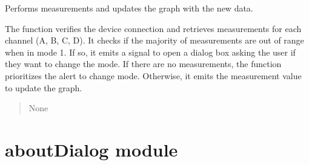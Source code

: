 \documentclass[letterpaper,10pt,english]{sphinxmanual}
\begin{document}
\begin{fulllineitems}

\begin{fulllineitems}
\label{\detokenize{StartStopHist:StartStopHist.WorkerThreadStartStopHistogram.threadCreated}}
\pysigstartsignatures
{}
\pysigstopsignatures
\end{fulllineitems}


\begin{fulllineitems}
\label{\detokenize{StartStopHist:StartStopHist.WorkerThreadStartStopHistogram.update}}
\pysigstartsignatures
{}
\pysigstopsignatures
\sphinxAtStartPar
Performs measurements and updates the graph with the new data.

\sphinxAtStartPar
The function verifies the device connection and retrieves measurements for each channel (A, B, C, D). 
It checks if the majority of measurements are out of range when in mode 1. If so, it emits a signal 
to open a dialog box asking the user if they want to change the mode. If there are no measurements, 
the function prioritizes the alert to change mode. Otherwise, it emits the measurement value to update 
the graph.
\begin{quote}\begin{description}
\sphinxAtStartPar
None

\end{description}\end{quote}

\end{fulllineitems}


\end{fulllineitems}


\sphinxstepscope


\chapter{aboutDialog module}
\label{\detokenize{aboutDialog:module-aboutDialog}}\label{\detokenize{aboutDialog:aboutdialog-module}}\label{\detokenize{aboutDialog::doc}}
\end{document}
